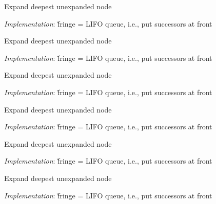 \documentclass{article}
\begin{document}
\begin{huge}

Expand deepest unexpanded node

\emph{Implementation}:\nl
\v{fringe} = LIFO queue, i.e., put successors at front

\textwidth
{}



Expand deepest unexpanded node

\emph{Implementation}:\nl
\v{fringe} = LIFO queue, i.e., put successors at front

\textwidth
{}



Expand deepest unexpanded node

\emph{Implementation}:\nl
\v{fringe} = LIFO queue, i.e., put successors at front

\textwidth
{}



Expand deepest unexpanded node

\emph{Implementation}:\nl
\v{fringe} = LIFO queue, i.e., put successors at front

\textwidth
{}



Expand deepest unexpanded node

\emph{Implementation}:\nl
\v{fringe} = LIFO queue, i.e., put successors at front

\textwidth
{}



Expand deepest unexpanded node

\emph{Implementation}:\nl
\v{fringe} = LIFO queue, i.e., put successors at front

\textwidth
{}



\end{huge}
\end{document}
